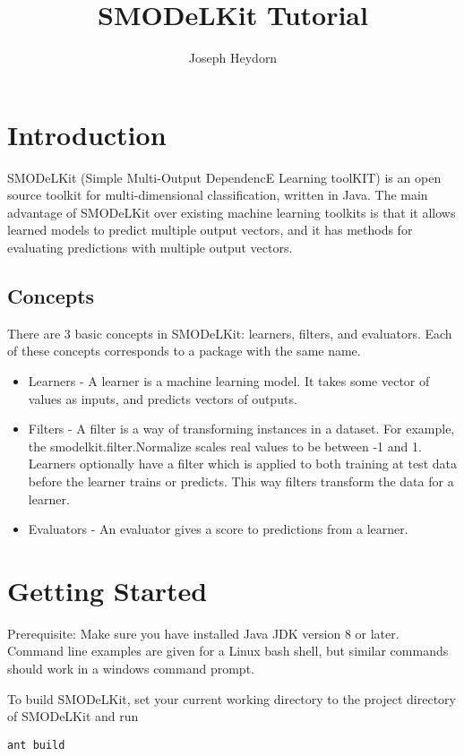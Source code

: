 \documentclass[twoside,11pt]{article}
\begin{document}
\title{SMODeLKit Tutorial}
\author{Joseph Heydorn}
\date{}
\maketitle

\tableofcontents

\section{Introduction}
SMODeLKit (Simple Multi-Output DependencE Learning toolKIT) is an open source toolkit for multi-dimensional classification, written in Java. The main advantage of SMODeLKit over existing machine learning toolkits is that it allows learned models to predict multiple output vectors, and it has methods for evaluating predictions with multiple output vectors.
\subsection{Concepts}

There are 3 basic concepts in SMODeLKit: learners, filters, and evaluators. Each of these concepts corresponds to a package with the same name. 
\begin{itemize}
\item Learners - A learner is a machine learning model. It takes some vector of values as inputs, and predicts vectors of outputs.
\item Filters - A filter is a way of transforming instances in a dataset. For example, the smodelkit.filter.Normalize scales real values to be between -1 and 1. Learners optionally have a filter which is applied to both training at test data before the learner trains or predicts. This way filters transform the data for a learner.
\item Evaluators - An evaluator gives a score to predictions from a learner.
\end{itemize}

\section{Getting Started}

Prerequisite: Make sure you have installed Java JDK version 8 or later.  Command line examples are given for a Linux bash shell, but similar commands should work in a windows command prompt.

To build SMODeLKit, set your current working directory to the project directory of SMODeLKit and run
\begin{lstlisting}[frame=single]
ant build
\end{lstlisting}
\end{document}

